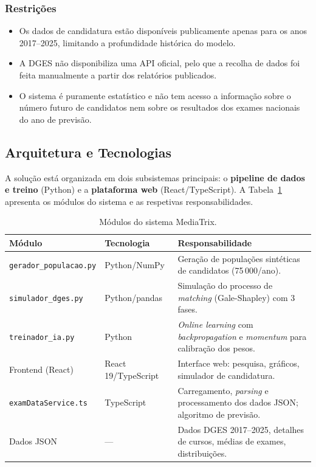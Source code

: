 \documentclass[12pt,a4paper]{article}
\begin{document}
\subsubsection{Restrições}

\begin{itemize}[noitemsep]
  \item Os dados de candidatura estão disponíveis publicamente apenas para os anos 2017--2025, limitando a profundidade histórica do modelo.
  \item A DGES não disponibiliza uma API oficial, pelo que a recolha de dados foi feita manualmente a partir dos relatórios publicados.
  \item O sistema é puramente estatístico e não tem acesso a informação sobre o número futuro de candidatos nem sobre os resultados dos exames nacionais do ano de previsão.
\end{itemize}

\subsection{Arquitetura e Tecnologias}

A solução está organizada em dois subsistemas principais: o \textbf{pipeline de dados e treino} (Python) e a \textbf{plataforma web} (React/TypeScript). A Tabela~\ref{tab:arquitetura} apresenta os módulos do sistema e as respetivas responsabilidades.

\begin{table}[H]
\centering
\caption{Módulos do sistema MediaTrix.}
\label{tab:arquitetura}
\begin{tabularx}{\textwidth}{llX}
\toprule
\textbf{Módulo} & \textbf{Tecnologia} & \textbf{Responsabilidade} \\
\midrule
\texttt{gerador\_populacao.py} & Python/NumPy & Geração de populações sintéticas de candidatos (75\,000/ano). \\
\texttt{simulador\_dges.py} & Python/pandas & Simulação do processo de \textit{matching} (Gale-Shapley) com 3 fases. \\
\texttt{treinador\_ia.py} & Python & \textit{Online learning} com \textit{backpropagation} e \textit{momentum} para calibração dos pesos. \\
Frontend (React) & React 19/TypeScript & Interface web: pesquisa, gráficos, simulador de candidatura. \\
\texttt{examDataService.ts} & TypeScript & Carregamento, \textit{parsing} e processamento dos dados JSON; algoritmo de previsão. \\
Dados JSON & --- & Dados DGES 2017--2025, detalhes de cursos, médias de exames, distribuições. \\
\bottomrule
\end{tabularx}
\end{table}
\end{document}
